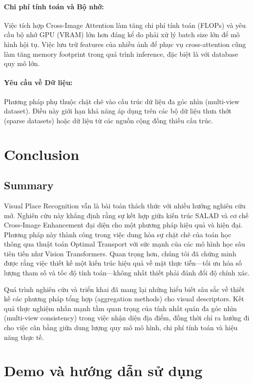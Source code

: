 \documentclass[12pt,a4paper]{article}
\begin{document}
    \paragraph{Chi phí tính toán và Bộ nhớ:}
    Việc tích hợp Cross-Image Attention làm tăng chi phí tính toán (FLOPs) và yêu cầu bộ nhớ GPU (VRAM) lớn hơn đáng kể do phải xử lý batch size lớn để mô hình hội tụ. Việc lưu trữ features của nhiều ảnh để phục vụ cross-attention cũng làm tăng memory footprint trong quá trình inference, đặc biệt là với database quy mô lớn.

    \paragraph{Yêu cầu về Dữ liệu:}
    Phương pháp phụ thuộc chặt chẽ vào cấu trúc dữ liệu đa góc nhìn (multi-view dataset). Điều này giới hạn khả năng áp dụng trên các bộ dữ liệu thưa thớt (sparse datasets) hoặc dữ liệu từ các nguồn cộng đồng thiếu cấu trúc.

    \section{Conclusion}

    \subsection{Summary}

    Visual Place Recognition vẫn là bài toán thách thức với nhiều hướng nghiên cứu mở. Nghiên cứu này khẳng định rằng sự kết hợp giữa kiến trúc SALAD và cơ chế Cross-Image Enhancement đại diện cho một phương pháp hiệu quả và hiện đại. Phương pháp này thành công trong việc dung hòa sự chặt chẽ của toán học thông qua thuật toán Optimal Transport với sức mạnh của các mô hình học sâu tiên tiến như Vision Transformers. Quan trọng hơn, chúng tôi đã chứng minh được rằng việc thiết kế một kiến trúc hiệu quả về mặt thực tiễn—tối ưu hóa số lượng tham số và tốc độ tính toán—không nhất thiết phải đánh đổi độ chính xác.

    Quá trình nghiên cứu và triển khai đã mang lại những hiểu biết sâu sắc về thiết kế các phương pháp tổng hợp (aggregation methods) cho visual descriptors. Kết quả thực nghiệm nhấn mạnh tầm quan trọng của tính nhất quán đa góc nhìn (multi-view consistency) trong việc nhận diện địa điểm, đồng thời chỉ ra hướng đi cho việc cân bằng giữa dung lượng quy mô mô hình, chi phí tính toán và hiệu năng thực tế.

    
    \section{Demo và hướng dẫn sử dụng}
\end{document}
